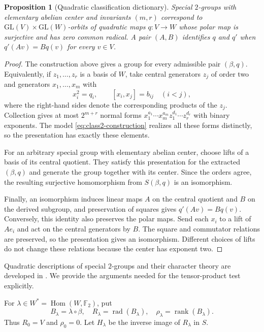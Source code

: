 \documentclass[11pt,a4paper]{amsart}
\newtheorem{prop}[thm]{Proposition}
\theoremstyle{definition}
\theoremstyle{remark}
\numberwithin{equation}{section}
\begin{document}
\begin{prop}[Quadratic classification dictionary]
\label{prop:class2-dictionary-new}
Special $2$-groups with elementary abelian center and invariants $(m,r)$
correspond to $\mathrm{GL}(V)\times\mathrm{GL}(W)$-orbits of quadratic
maps $q:V\to W$ whose polar map is surjective and has zero common
radical. A pair $(A,B)$ identifies $q$ and $q'$ when
$q'(Av)=Bq(v)$ for every $v\in V$.
\end{prop}
\begin{proof}
The construction above gives a group for every admissible pair
$(\beta,q)$. Equivalently, if $z_1,\ldots,z_r$ is a basis of $W$,
take central generators $z_j$ of order two and generators
$x_1,\ldots,x_m$ with
\[
 x_i^2=q_i,\qquad [x_i,x_j]=b_{ij}\quad(i<j),
\]
where the right-hand sides denote the corresponding products of the
$z_j$. Collection gives at most $2^{m+r}$ normal forms
$x_1^{a_1}\cdots x_m^{a_m}z_1^{d_1}\cdots z_r^{d_r}$ with binary
exponents. The model \eqref{eq:class2-construction} realizes all these
forms distinctly, so the presentation has exactly these elements.

For an arbitrary special group with elementary abelian center,
choose lifts of a basis of its central quotient. They satisfy this
presentation for the extracted $(\beta,q)$ and generate the group
together with its center. Since the orders agree, the resulting
surjective homomorphism from $S(\beta,q)$ is an isomorphism.

Finally, an isomorphism induces linear maps $A$ on the central quotient
and $B$ on the derived subgroup, and preservation of squares gives
$q'(Av)=Bq(v)$. Conversely, this identity also preserves the polar maps.
Send each $x_i$ to a lift of $Ae_i$ and act on the central generators
by $B$. The square and commutator relations are preserved, so the
presentation gives an isomorphism. Different choices of lifts do not
change these relations because the center has exponent two.
\end{proof}


Quadratic descriptions of special $2$-groups and their character theory
are developed in \cite{KK15}. We provide the arguments needed for the
tensor-product test explicitly.

For $\lambda\in W^*=\operatorname{Hom}(W,\mathbb F_2)$, put
\[
 B_\lambda=\lambda\circ\beta,\quad
 R_\lambda=\operatorname{rad}(B_\lambda),\quad
 \rho_\lambda=\operatorname{rank}(B_\lambda).
\]
Thus $R_0=V$ and $\rho_0=0$. Let $H_\lambda$ be the inverse image of
$R_\lambda$ in $S$.
\end{document}
